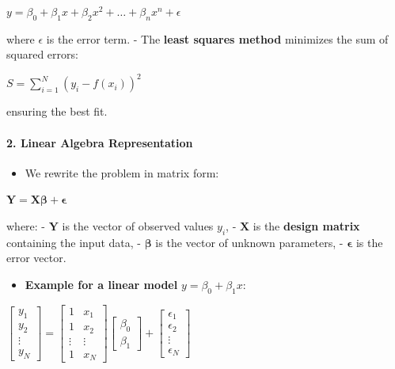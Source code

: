 \documentclass[11pt]{article}
\providecommand{\tightlist}{%
      \setlength{\itemsep}{0pt}\setlength{\parskip}{0pt}}
\begin{document}
\(y = \beta_0 + \beta_1 x + \beta_2 x^2 + \dots + \beta_n x^n + \epsilon\)

where \(\epsilon\) is the error term. - The \textbf{least squares
method} minimizes the sum of squared errors:

\(S = \sum_{i=1}^{N} (y_i - f(x_i))^2\)

ensuring the best fit.

\paragraph{\texorpdfstring{\textbf{2. Linear Algebra
Representation}}{2. Linear Algebra Representation}}\label{linear-algebra-representation}

\begin{itemize}
\tightlist
\item
  We rewrite the problem in matrix form:
\end{itemize}

\(\mathbf{Y} = \mathbf{X} \boldsymbol{\beta} + \boldsymbol{\epsilon}\)

where: - \(\mathbf{Y}\) is the vector of observed values \(y_i\), -
\(\mathbf{X}\) is the \textbf{design matrix} containing the input data,
- \(\boldsymbol{\beta}\) is the vector of unknown parameters, -
\(\boldsymbol{\epsilon}\) is the error vector.

\begin{itemize}
\tightlist
\item
  \textbf{Example for a linear model} \(y = \beta_0 + \beta_1 x\):
\end{itemize}

\(\begin{bmatrix} y_1 \\ y_2 \\ \vdots \\ y_N \end{bmatrix} = \begin{bmatrix} 1 & x_1 \\ 1 & x_2 \\ \vdots & \vdots \\ 1 & x_N \end{bmatrix} \begin{bmatrix} \beta_0 \\ \beta_1 \end{bmatrix} + \begin{bmatrix} \epsilon_1 \\ \epsilon_2 \\ \vdots \\ \epsilon_N \end{bmatrix}\)
\end{document}
